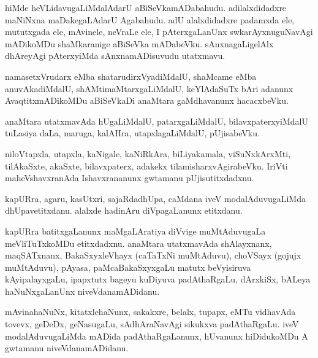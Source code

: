 \documentclass{article}
\begin{document}
\begin{mn}
hiMde  heVLidavugaLiMdalAdarU  aBiSeVkamADabahudu.  adilalxdidadxre  maNiNxna  maDakegaLAdarU  Agabahudu.  
adU  alalxdidadxre  padamxda  ele,  mututxgada ele,  mAvinele,  neVraLe ele,  I  pAterxgaLanUnx  swkarAyxnuguNavAgi  
mADikoMDu  shaMkaranige  aBiSeVka mADabeVku.  sAnxnagaLigelAlx  dhAreyAgi  pAterxyiMda  sAnxnamADisuvudu  utatxmavu.
\end{mn}

\begin{mn}
namasetxVrudarx  eMba  shatarudirxVyadiMdalU,  shaMcame  eMba  anuvAkadiMdalU,  shAMtimaMtarxgaLiMdalU,  keYlAdaSuTx  
bAri  adanunx  AvaqtitxmADikoMDu  aBiSeVkaDi  anaMtara  gaMdhavanunx  hacacxbeVku.
\end{mn}

\begin{mn}
anaMtara    utatxmavAda  hUgaLiMdalU,  patarxgaLiMdalU,  bilavxpaterxyiMdalU  tuLasiya daLa,  maruga,  kalAHra,  
utapxlagaLiMdalU,  pUjisabeVku.
\end{mn}

\begin{mn}
niloVtapxla,  utapxla,  kaNigale,  kaNiRkAra,  biLiyakamala,  viSuNxkArxMti,  tilAkaSxte,  akaSxte,  bilavxpaterx,  
adakekx  tilamisharxvAgirabeVku.  IriVti  maheVshavxranAda  Ishavxrananunx  gwtamanu  pUjisutitxdadxnu.
\end{mn}

\begin{mn}
kapURra,  agaru,  kasUtxri,  sajaRdadhUpa,  caMdana  iveV  modalAduvugaLiMda  dhUpavetitxdanu.  alalxde  
hadinAru  diVpagaLanunx  etitxdanu.
\end{mn}

\begin{mn}
kapURra  batitxgaLanunx  maMgaLAratiya  diVvige  muMtAduvugaLa  meVliTuTxkoMDu  etitxdadxnu.  anaMtara  
utatxmavAda  shAlayxnanx,  maqSATxnanx,  BakaSxyxleVhayx (caTaTxNi  muMtAduvu),  choVSayx (gojujx  muMtAduvu),  
pAyasa,  paMcaBakaSxyxgaLu  matutx  beVyisiruva  kAyipalayxgaLu,  ipapxtutx  bageyu  kuDiyuva  padAthaRgaLu,  
dArxkiSx,  bALeya  haNuNxgaLanUnx  niveVdanamADidanu.
\end{mn}

\begin{mn}
mAvinahaNuNx,  kitatxlehaNunx,  sakakxre,  belalx,  tupapx,  eMTu  vidhavAda  tovevx,  geDeDx,  geNasugaLu,  
sAdhAraNavAgi  sikukxva  padAthaRgaLu.  iveV  modalAduvugaLiMda  mADida  padAthaRgaLanunx,  hUvanunx  
hiDidukoMDu  A  gwtamanu  niveVdanamADidanu.
\end{mn}
\end{document}
